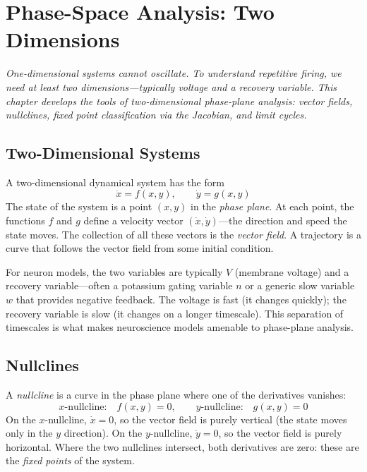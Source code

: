 \chapter{Phase-Space Analysis: Two Dimensions}
\label{ch:phase-plane-2d}

\textit{One-dimensional systems cannot oscillate. To understand repetitive firing, we need at least two dimensions---typically voltage and a recovery variable. This chapter develops the tools of two-dimensional phase-plane analysis: vector fields, nullclines, fixed point classification via the Jacobian, and limit cycles.}

\section{Two-Dimensional Systems}
\label{sec:2d-systems}

A two-dimensional dynamical system has the form
%
\begin{equation}
  \dot{x} = f(x, y), \qquad \dot{y} = g(x, y)
  \label{eq:2d-system}
\end{equation}
%
The state of the system is a point $(x, y)$ in the \emph{phase plane}. At each point, the functions $f$ and $g$ define a velocity vector $(\dot{x}, \dot{y})$---the direction and speed the state moves. The collection of all these vectors is the \emph{vector field}. A trajectory is a curve that follows the vector field from some initial condition.

For neuron models, the two variables are typically $V$ (membrane voltage) and a recovery variable---often a potassium gating variable $n$ or a generic slow variable $w$ that provides negative feedback. The voltage is fast (it changes quickly); the recovery variable is slow (it changes on a longer timescale). This separation of timescales is what makes neuroscience models amenable to phase-plane analysis.

\section{Nullclines}
\label{sec:nullclines}

A \emph{nullcline} is a curve in the phase plane where one of the derivatives vanishes:
%
\begin{equation}
  \text{$x$-nullcline:}\quad f(x, y) = 0, \qquad
  \text{$y$-nullcline:}\quad g(x, y) = 0
  \label{eq:nullclines}
\end{equation}
%
On the $x$-nullcline, $\dot{x} = 0$, so the vector field is purely vertical (the state moves only in the $y$ direction). On the $y$-nullcline, $\dot{y} = 0$, so the vector field is purely horizontal. Where the two nullclines intersect, both derivatives are zero: these are the \emph{fixed points} of the system.

